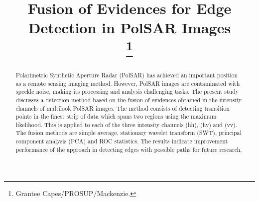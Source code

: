 \documentclass[conference]{IEEEtran}
\begin{document}
\title{Fusion of Evidences for Edge Detection in PolSAR Images\\
\thanks{Grantee Capes/PROSUP/Mackenzie.}
}
\author{
\and
{}
\and
{}
}
\maketitle
\begin{abstract}
Polarimetric Synthetic Aperture Radar (PolSAR) has achieved an important position as a remote sensing imaging method. 
However, PolSAR images are contaminated with speckle noise, making its processing and analysis challenging tasks. 
The present study discusses a detection method based on the fusion of evidences obtained in the intensity channels of multilook PolSAR images.
The method consists of detecting transition points in the finest strip of data which spans two regions using the maximum likelihood.
This is applied to each of the three intensity channels (hh), (hv) and (vv). 
The fusion methods are simple average, stationary wavelet transform (SWT), principal component analysis (PCA) and ROC statistics.  
The results indicate improvement performance of the approach in detecting edges with possible paths for future research.
\end{abstract}
\end{document}
